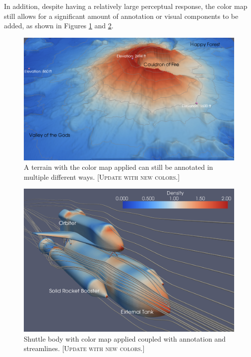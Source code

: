 \documentclass[review,journal]{vgtc}         %
\newcommand{\sticky}[1]{\textsc{[#1]}}
\begin{document}
In addition, despite having a relatively large perceptual response, the
color map still allows for a significant amount of annotation or visual
components to be added, as shown in Figures
\ref{fig:ColorMapWithAnnotation} and \ref{fig:ColorMapOnShuttle}.

\begin{figure}
  \centering
  \includegraphics[width=\linewidth]{images/AnnotationExample}
  \caption{A terrain with the color map applied can still be annotated in
    multiple different ways. \sticky{Update with new colors.}}
  \label{fig:ColorMapWithAnnotation}
\end{figure}

\begin{figure}
  \centering
  \includegraphics[width=\linewidth]{images/ShuttleExample}
  \caption{Shuttle body with color map applied coupled with annotation and
    streamlines. \sticky{Update with new colors.}}
  \label{fig:ColorMapOnShuttle}
\end{figure}
\end{document}
